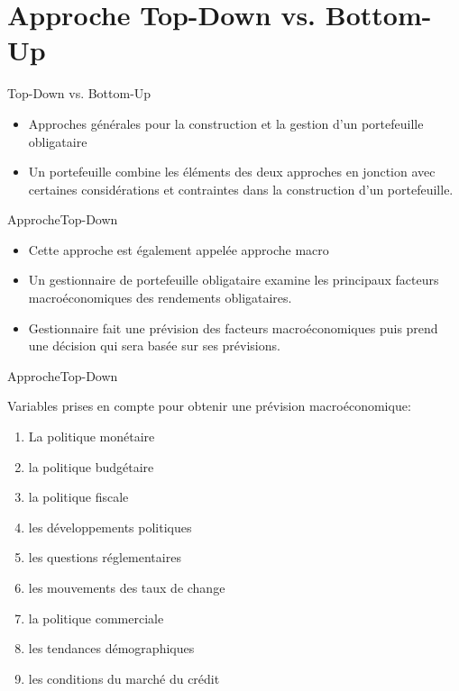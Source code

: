 \documentclass{beamer}
\begin{document}
\section{Approche Top-Down vs.  Bottom-Up}
\begin{frame}{Top-Down vs. Bottom-Up}

\begin{itemize}[label=\bullet]
\item Approches générales pour la construction et la gestion d'un portefeuille obligataire
\item Un portefeuille combine les éléments des deux approches en jonction avec certaines considérations et contraintes dans la construction d'un portefeuille.
\end{itemize}
\end{frame}


\begin{frame}{ApprocheTop-Down}
\begin{itemize}[label=\bullet]
\item Cette approche est également appelée approche macro
\item Un gestionnaire de portefeuille obligataire examine les principaux facteurs macroéconomiques des rendements obligataires.
\item Gestionnaire fait une prévision des facteurs macroéconomiques puis prend une décision qui sera basée sur ses prévisions.
\end{itemize}
\end{frame}


\begin{frame}{ApprocheTop-Down}

Variables prises en compte pour obtenir une prévision macroéconomique:
\begin{enumerate}[label=\arabic*)]
\item La politique monétaire
\item la politique budgétaire
\item la politique fiscale
\item les développements politiques
\item les questions réglementaires
\item les mouvements des taux de change
\item la politique commerciale
\item les tendances démographiques
\item les conditions du marché du crédit
\end{enumerate}
\end{frame}
\end{document}
